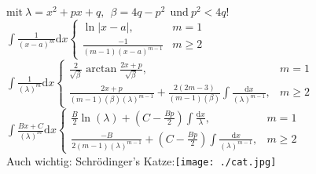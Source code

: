 \documentclass[6pt,a4paper]{scrartcl}
\begin{document}
\begin{multicols}{4}
$\text{mit} ~ \lambda=x^2+px+q, ~~ \beta=4q-p^2 ~~ \text{und} ~p^2<4q$!
$\int\frac{1}{(x-a)^m}\mathrm dx \begin{cases} \ln\left|x-a\right|, & m=1\\ \frac{-1}{(m-1)(x-a)^{m-1}} &m\geq2 \end{cases}$\\
$\int\frac{1}{(\lambda)^m} \mathrm dx \begin{cases} \frac{2}{\sqrt{\beta}} \arctan\frac{2x+p}{\sqrt{\beta}}, &m=1\\ \frac{2x+p}{(m-1)(\beta)(\lambda)^{m-1}}+\frac{2(2m-3)}{(m-1)(\beta)} \int\frac{\mathrm dx}{(\lambda)^{m-1}}, &m\geq2 \end{cases}$\\
$\int\frac{Bx+C}{(\lambda)^m} \mathrm dx \begin{cases} \frac{B}{2} \ln(\lambda) + (C-\frac{Bp}{2}) \int\frac{\mathrm dx}{\lambda}, &m=1\\ \frac{-B}{2(m-1)(\lambda)^{m-1}} + (C-\frac{Bp}{2}) \int\frac{\mathrm dx}{(\lambda)^{m-1}}, &m\geq2 \end{cases}$\\
Auch wichtig: Schrödinger's Katze:\texttt{[image: ./cat.jpg]}	%
\end{multicols}


\end{document}
